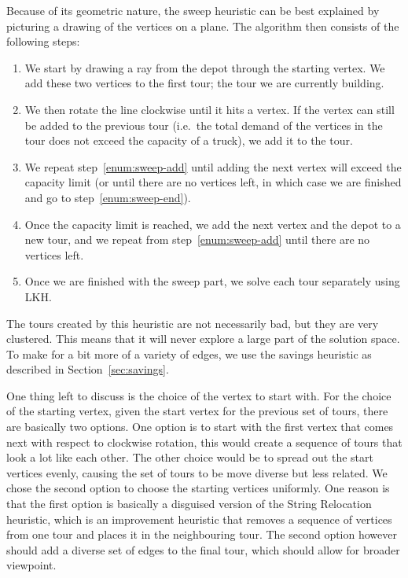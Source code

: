 \documentclass[titlepage, 12pt]{article}
\begin{document}
    Because of its geometric nature, the sweep heuristic can be best explained by picturing a
    drawing of the vertices on a plane. The algorithm then consists of the following steps:
    \begin{enumerate}
        \itemsep 0em
        \item
            We start by drawing a ray from the depot through the starting vertex. We add these two
            vertices to the first tour; the tour we are currently building.
        \item
        \label{enum:sweep-add}
            We then rotate the line clockwise until it hits a vertex. If the vertex can still be
            added to the previous tour (i.e.\ the total demand of the vertices in the tour does not
            exceed the capacity of a truck), we add it to the tour.
        \item
            We repeat step~\ref{enum:sweep-add} until adding the next vertex will exceed the
            capacity limit (or until there are no vertices left, in which case we are finished and
            go to step~\ref{enum:sweep-end}).
        \item
            Once the capacity limit is reached, we add the next vertex and the depot to a new tour,
            and we repeat from step~\ref{enum:sweep-add} until there are no vertices left.
        \item
        \label{enum:sweep-end}
            Once we are finished with the sweep part, we solve each tour separately using LKH.
    \end{enumerate}

    The tours created by this heuristic are not necessarily bad, but they are very clustered. This
    means that it will never explore a large part of the solution space. To make for a bit more of a
    variety of edges, we use the savings heuristic as described in Section~\ref{sec:savings}.

    One thing left to discuss is the choice of the vertex to start with. For the choice of the
    starting vertex, given the start vertex for the previous set of tours, there are basically two
    options.
    One option is to start with the first vertex that comes next with respect to clockwise
    rotation, this would create a sequence of tours that look a lot like each other. The other
    choice would be to spread out the start vertices evenly, causing the set of tours to be move
    diverse but less related.
    We chose the second option to choose the starting vertices uniformly. One reason is that the
    first option is basically a disguised version of the String Relocation heuristic, which is an
    improvement heuristic that removes a sequence of vertices from one tour and places it in the
    neighbouring tour. The second option however should add a diverse set of edges to the final
    tour, which should allow for broader viewpoint.
\end{document}
